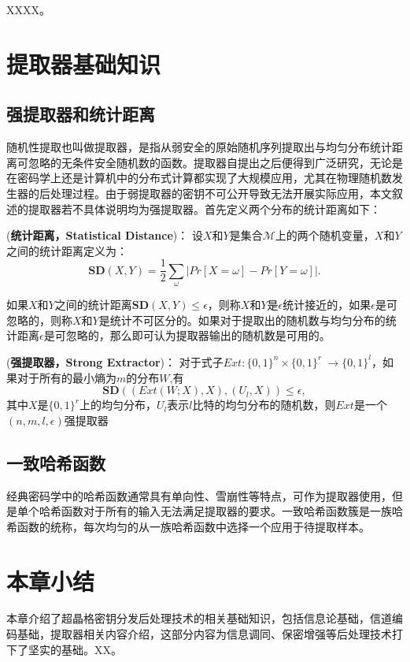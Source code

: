 XXXX。


\section{提取器基础知识}
\subsection{强提取器和统计距离}

随机性提取也叫做提取器，是指从弱安全的原始随机序列提取出与均匀分布统计距离可忽略的无条件安全随机数的函数。提取器自提出之后便得到广泛研究，无论是在密码学上还是计算机中的分布式计算都实现了大规模应用，尤其在物理随机数发生器的后处理过程。由于弱提取器的密钥不可公开导致无法开展实际应用，本文叙述的提取器若不具体说明均为强提取器。首先定义两个分布的统计距离如下：

\begin{definition}{(\textbf{统计距离，Statistical Distance})：}
	设$X$和$Y$是集合$\mathcal{M}$上的两个随机变量，$X$和$Y$之间的统计距离定义为：
	\begin{equation}
		\mathbf{SD}(X,Y)=\frac{1}{2}\sum_{\omega}|Pr[X=\omega]-Pr[Y=\omega]|.
	\end{equation}
\end{definition}
如果$X$和$Y$之间的统计距离$\mathbf{SD}(X,Y)\leq \epsilon$，则称$X$和$Y$是$\epsilon$统计接近的，如果$\epsilon$是可忽略的，则称$X$和$Y$是统计不可区分的。如果对于提取出的随机数与均匀分布的统计距离$\epsilon$是可忽略的，那么即可认为提取器输出的随机数是可用的。

\begin{definition}{(\textbf{强提取器，Strong Extractor})：}
	对于式子$Ext:\{0,1\}^n \times \{0,1\}^r\ \rightarrow \{0,1\}^l$，如果对于所有的最小熵为$m$的分布$W$,有
	\begin{equation}
		\mathbf{SD}((Ext(W;X),X),(U_l,X)) \leq \epsilon,
	\end{equation}
	其中$X$是$\{0,1\}^r$上的均匀分布，$U_l$表示$l$比特的均匀分布的随机数，则$Ext$是一个$(n,m,l,\epsilon)$强提取器
	
\end{definition}


\subsection{一致哈希函数}
经典密码学中的哈希函数通常具有单向性、雪崩性等特点，可作为提取器使用，但是单个哈希函数对于所有的输入无法满足提取器的要求。一致哈希函数簇是一族哈希函数的统称，每次均匀的从一族哈希函数中选择一个应用于待提取样本。








\section{本章小结}
本章介绍了超晶格密钥分发后处理技术的相关基础知识，包括信息论基础，信道编码基础，提取器相关内容介绍，这部分内容为信息调同、保密增强等后处理技术打下了坚实的基础。XX。



